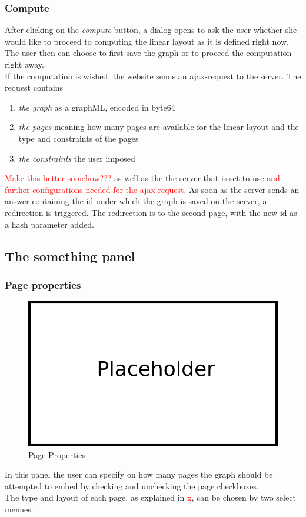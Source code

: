 \subsubsection{Compute}
After clicking on the \textit{compute} button, a dialog opens to ask the user whether she would like to proceed to computing the linear layout as it is defined right now. The user then can choose to first save the graph or to proceed the computation right away.\\
If the computation is wished, the website sends an ajax-request to the server. The request contains
\begin{enumerate}
\item \textit{the graph} as a graphML, encoded in byte64
\item \textit{the pages} meaning how many pages are available for the linear layout and the type and constraints of the pages
\item \textit{the constraints} the user imposed
\end{enumerate}
\textcolor{red}{Make this better somehow???}
as well as the the server that is set to use \textcolor{red}{and further configurations needed for the ajax-request}.
As soon as the server sends an answer containing the id under which the graph is saved on the server, a redirection is triggered. The redirection is to the second page, with the new id as a hash parameter added.
\subsection{The something panel}
\subsubsection{Page properties}
\label{imp_pages}
\begin{figure}[!h]
\begin{center}
\includegraphics[width=1\textwidth]{figures/Platzhalter.png}
\caption{Page Properties}
\label{img:plzhltr}
\end{center}
\end{figure}
In this panel the user can specify on how many pages the graph should be attempted to embed by checking and unchecking the page checkboxes.\\
The type and layout of each page, as explained in \textcolor{red}{x}, can be chosen by two select menues. 
